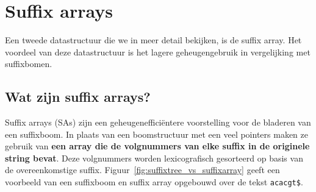 \chapter{Suffix arrays}\label{ch:suffix-arrays}
Een tweede datastructuur die we in meer detail bekijken, is de suffix array.
Het voordeel van deze datastructuur is het lagere geheugengebruik in vergelijking met suffixbomen.


\section{Wat zijn suffix arrays?}\label{sec:wat-zijn-suffix-arrays?}
Suffix arrays (SAs) zijn een geheugenefficiëntere voorstelling voor de bladeren van een suffixboom.
In plaats van een boomstructuur met een veel pointers maken ze gebruik van \textbf{een array die de volgnummers van elke suffix in de originele string bevat}.
Deze volgnummers worden lexicografisch gesorteerd op basis van de overeenkomstige suffix.
Figuur~\ref{fig:suffixtree_vs_suffixarray} geeft een voorbeeld van een suffixboom en suffix array opgebouwd over de tekst \texttt{acacgt\$}.

